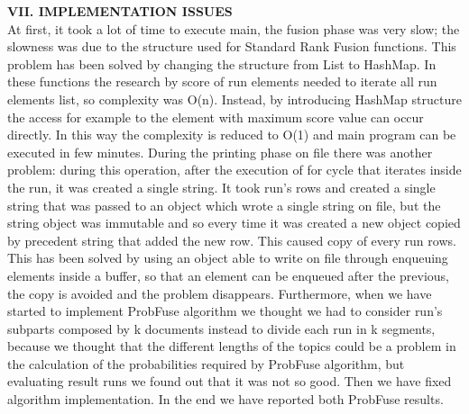 \documentclass[12pt,journal]{IEEEtran}
\begin{document}
\textbf{VII. IMPLEMENTATION ISSUES} \\
At first, it took a lot of time to execute main, the fusion phase was very slow; the slowness was due to the structure used for Standard Rank Fusion functions. This problem has been solved by changing the structure from List to HashMap. 
In these functions the research by score of run elements needed to iterate all run elements list, so complexity was O(n). Instead, by introducing HashMap structure the access for example to the element with maximum score value can occur directly. In this way the complexity is reduced to O(1) and main program can be executed in few minutes. 
During the printing phase on file there was another problem: during this operation, after the execution of for cycle that iterates inside the run, it was created a single string. It took run’s rows and created a single string that was passed to an object which wrote a single string on file, but the string object was immutable and so every time it was created a new object copied by precedent string that added the new row. This caused copy of every run rows. This has been solved by using an object able to write on file through enqueuing elements inside a buffer, so that an element can be enqueued after the previous, the copy is avoided and the problem disappears.
Furthermore, when we have started to implement ProbFuse algorithm we thought we had to consider run's subparts composed by k documents instead to divide each run in k segments, because we thought that the different lengths of the topics could be a problem in the calculation of the probabilities required by ProbFuse algorithm, but evaluating result runs we found out that it was not so good. Then we have fixed algorithm implementation. In the end we have reported both ProbFuse results. 
 \\
\end{document}
